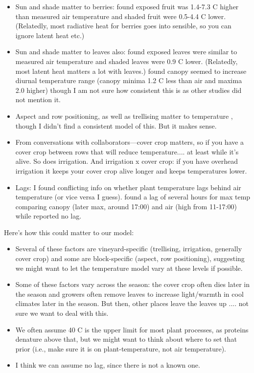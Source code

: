 \documentclass[11pt,letter]{article}
\newenvironment{smitemize}{
\begin{itemize}
  \setlength{\itemsep}{0pt}
  \setlength{\parskip}{0.8pt}
  \setlength{\parsep}{0pt}}
{\end{itemize}
}
\begin{document}
\begin{smitemize}
\item Sun and shade matter to berries: \citet{millar1972} found exposed fruit was 1.4-7.3 C higher than measured air temperature and shaded fruit were 0.5-4.4 C lower. (Relatedly, most radiative heat for berries goes into sensible, so you can ignore latent heat etc.)
\item Sun and shade matter to leaves also: \citet{millar1972} found exposed leaves were similar to measured air temperature and shaded leaves were 0.9 C lower. (Relatedly, most latent heat matters a lot with leaves.) \citet{pena2020} found canopy seemed to increase diurnal temperature range (canopy minima 1.2 C less than air and maxima 2.0 higher) though I am not sure how consistent this is as other studies did not mention it. 
\item Aspect and row positioning, as well as trellising matter to temperature \citep{costa2019}, though I didn't find a consistent model of this. But it makes sense.
\item From conversations with collaborators---cover crop matters, so if you have a cover crop between rows that will reduce temperature.... at least while it's alive. So does irrigation. And irrigation x cover crop: if you have overhead irrigation it keeps your cover crop alive longer and keeps temperatures lower.
\item Lags: I found conflicting info on whether plant temperature lags behind air temperature (or vice versa I guess). \citet{costa2019} found a lag of several hours for max temp comparing canopy (later max, around 17:00) and air (high from 11-17:00) while \citet{pena2020} reported no lag.
\end{smitemize}

Here's how this could matter to our model:

\begin{smitemize}
\item Several of these factors are vineyard-specific (trellising, irrigation, generally cover crop) and some are block-specific (aspect, row positioning), suggesting we might want to let the temperature model vary at these levels if possible.
\item Some of these factors vary across the season: the cover crop often dies later in the season and growers often remove leaves to increase light/warmth in cool climates later in the season. But then, other places leave the leaves up .... not sure we want to deal with this. 
\item We often assume 40 C is the upper limit for most plant processes, as proteins denature above that, but we might want to think about where to set that prior (i.e., make sure it is on plant-temperature, not air temperature).
\item I think we can assume no lag, since there is not a known one. 
\end{smitemize}
\end{document}
